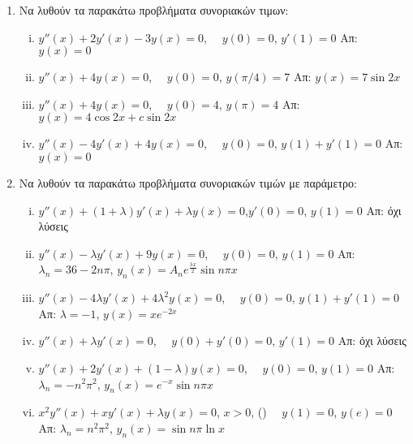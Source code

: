 \documentclass[a4paper,table]{report}
\begin{document}

\begin{center}
\minibox{\large \bfseries \textcolor{Col1}{Προβλήματα Sturm-Liouville}}
\end{center}

\vspace{\baselineskip}


\begin{enumerate}
\item Να λυθούν τα παρακάτω προβλήματα συνοριακών τιμων:
  \begin{enumerate}[i)]
    \item $y''(x)+2y'(x)-3y(x)=0$, $\quad y(0)=0$, $y'(1)=0$ \hfill Απ: $y(x)=0$
    \item $y''(x)+4y(x)=0$, $\quad y(0)=0$, $y(\pi/4)=7$ 
      \hfill Απ: $y(x)=7\sin 2x$
    \item $y''(x)+4y(x)=0$, $\quad y(0)=4$, $y(\pi)=4$ \hfill Απ: $y(x)=4\cos 2x+c\sin 2x$
    \item $y''(x)-4y'(x)+4y(x)=0$, $\quad y(0)=0$, $y(1)+y'(1)=0$ \hfill Απ: $y(x)=0$
  \end{enumerate}

\item Να λυθούν τα παρακάτω προβλήματα συνοριακών τιμών με παράμετρο:
  \begin{enumerate}[i)]
    \item $y''(x)+(1+\lambda)y'(x)+\lambda y(x)=0$,\quad $y'(0)=0$, $y(1)=0$ 
      \hfill Απ: όχι λύσεις
    \item $y''(x)-\lambda y'(x)+9y(x)=0$, $\quad y(0)=0$, $y(1)=0$
      \hfill Απ: $\scriptstyle{\lambda_{n}=36-2n\pi}$, 
      $\scriptstyle{y_{n}(x)=A_{n}e^{\frac{\lambda x}{2}}\sin n\pi x}$
    \item $y''(x)-4\lambda y'(x)+4\lambda^{2}y(x)=0$, $\quad y(0)=0$, $y(1)+y'(1)=0$
      \hfill Απ: $\lambda=-1$, $y(x)=xe^{-2x}$
    \item $y''(x)+\lambda y'(x)=0$, $\quad y(0)+y'(0)=0$, $y'(1)=0$ 
      \hfill Απ: όχι λύσεις
    \item $y''(x)+2y'(x)+(1-\lambda)y(x)=0$, $\quad y(0)=0$, $y(1)=0$
      \hfill Απ: $\scriptstyle{\lambda_{n}=-n^{2}\pi^{2}}$, 
      $\scriptstyle{y_{n}(x)=e^{-x}\sin n\pi x}$
    \item $x^{2}y''(x)+x y'(x)+\lambda y(x)=0$, $x>0$, \; 
      \textcolor{Col1}{()} $\quad 
      y(1)=0$, $y(e)=0$ \hfill Απ: $\scriptstyle{\lambda_{n}=n^{2}\pi^{2}}$, 
      $\scriptstyle{y_{n}(x)=\sin n\pi\ln x}$
  \end{enumerate}
\end{enumerate}
\end{document}
